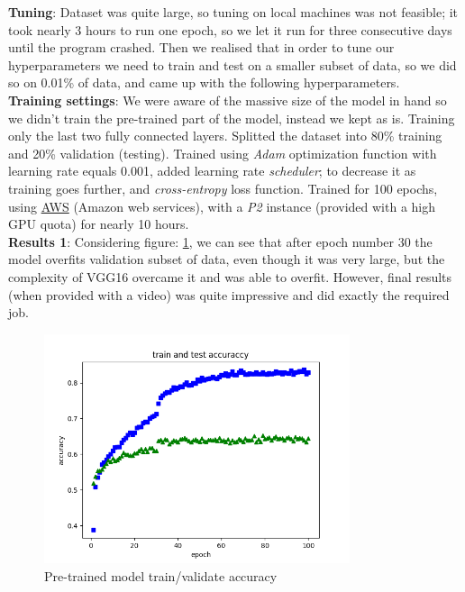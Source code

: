 \textbf{Tuning}: Dataset was quite large, so tuning on local machines was not feasible; it took nearly 3 hours to run one epoch, so we let it run for three consecutive days until the program crashed. Then we realised that in order to tune our hyperparameters we need to train and test on a smaller subset of data, so we did so on 0.01\% of data, and came up with the following hyperparameters.\\

\textbf{Training settings}: We were aware of the massive size of the model in hand so we didn't train the pre-trained part of the model, instead we kept as is. Training only the last two fully connected layers. Splitted the dataset into 80\% training and 20\% validation (testing). Trained using \textit{Adam} optimization function with learning rate equals 0.001, added learning rate \textit{scheduler}; to decrease it as training goes further, and \textit{cross-entropy} loss function. Trained for 100 epochs, using \href{https://aws.amazon.com/}{AWS} (Amazon web services), with a \textit{P2} instance (provided with a high GPU quota) for nearly 10 hours.\\

\textbf{Results 1}: Considering figure: \ref{fig:emoiton_result_1}, we can see that after epoch number 30 the model overfits validation subset of data, even though it was very large, but the complexity of VGG16 overcame it and was able to overfit. However, final results (when provided with a video) was quite impressive and did exactly the required job.\\


\begin{figure}[h!]
\centering
\includegraphics[width=0.8\textwidth]{images/emotion_result_1.png}
\caption{Pre-trained model train/validate accuracy}
\label{fig:emoiton_result_1}
\end{figure}

